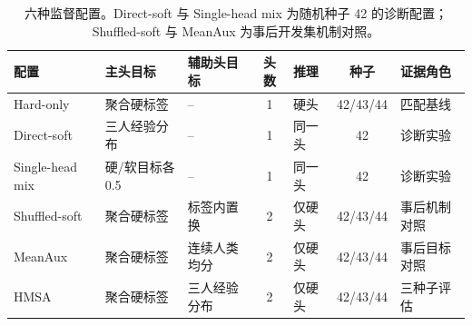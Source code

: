 \begin{table}[H]
\centering
\caption{六种监督配置。Direct-soft 与 Single-head mix 为随机种子 42 的诊断配置；Shuffled-soft 与 MeanAux 为事后开发集机制对照。}
\label{tab:method_matrix}
\small
\setlength{\tabcolsep}{3pt}
\begin{tabularx}{\linewidth}{@{}lYYcYcY@{}}
\toprule
配置 & 主头目标 & 辅助头目标 & 头数 & 推理 & 种子 & 证据角色 \\
\midrule
Hard-only & 聚合硬标签 & -- & 1 & 硬头 & 42/43/44 & 匹配基线 \\
Direct-soft & 三人经验分布 & -- & 1 & 同一头 & 42 & 诊断实验 \\
Single-head mix & 硬/软目标各 0.5 & -- & 1 & 同一头 & 42 & 诊断实验 \\
Shuffled-soft & 聚合硬标签 & 标签内置换 & 2 & 仅硬头 & 42/43/44 & 事后机制对照 \\
MeanAux & 聚合硬标签 & 连续人类均分 & 2 & 仅硬头 & 42/43/44 & 事后目标对照 \\
HMSA & 聚合硬标签 & 三人经验分布 & 2 & 仅硬头 & 42/43/44 & 三种子评估 \\
\bottomrule
\end{tabularx}
\end{table}
